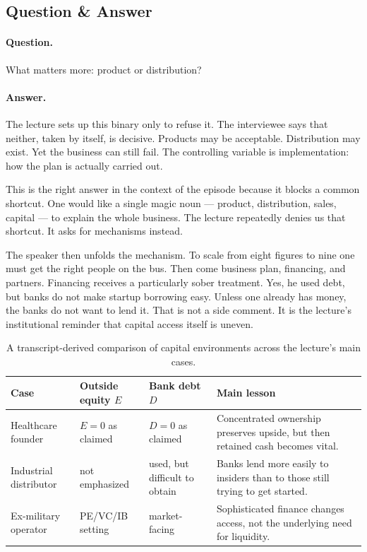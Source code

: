 \subsection{Question \& Answer}

\paragraph{Question.} What matters more: product or distribution?

\paragraph{Answer.} The lecture sets up this binary only to refuse it. The interviewee says that neither, taken by itself, is decisive. Products may be acceptable. Distribution may exist. Yet the business can still fail. The controlling variable is implementation: how the plan is actually carried out.

This is the right answer in the context of the episode because it blocks a common shortcut. One would like a single magic noun --- product, distribution, sales, capital --- to explain the whole business. The lecture repeatedly denies us that shortcut. It asks for mechanisms instead.

The speaker then unfolds the mechanism. To scale from eight figures to nine one must get the right people on the bus. Then come business plan, financing, and partners. Financing receives a particularly sober treatment. Yes, he used debt, but banks do not make startup borrowing easy. Unless one already has money, the banks do not want to lend it. That is not a side comment. It is the lecture's institutional reminder that capital access itself is uneven.

\begin{table}[h]
\centering
\begin{tabular}{|p{3.0cm}|p{2.3cm}|p{2.3cm}|p{5.4cm}|}
\hline
Case & Outside equity $E$ & Bank debt $D$ & Main lesson \\
\hline
Healthcare founder & $E=0$ as claimed & $D=0$ as claimed & Concentrated ownership preserves upside, but then retained cash becomes vital. \\
\hline
Industrial distributor & not emphasized & used, but difficult to obtain & Banks lend more easily to insiders than to those still trying to get started. \\
\hline
Ex-military operator & PE/VC/IB setting & market-facing & Sophisticated finance changes access, not the underlying need for liquidity. \\
\hline
\end{tabular}
\caption{A transcript-derived comparison of capital environments across the lecture's main cases.}
\end{table}

